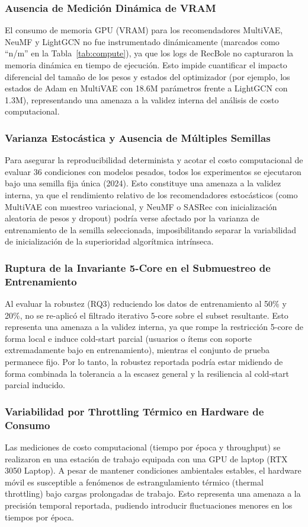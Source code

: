\documentclass[journal]{IEEEtran}
\begin{document}
\subsubsection{Ausencia de Medición Dinámica de VRAM}
El consumo de memoria GPU (VRAM) para los recomendadores MultiVAE, NeuMF y LightGCN no fue instrumentado dinámicamente (marcados como ``n/m'' en la Tabla~\ref{tab:compute}), ya que los logs de RecBole no capturaron la memoria dinámica en tiempo de ejecución. Esto impide cuantificar el impacto diferencial del tamaño de los pesos y estados del optimizador (por ejemplo, los estados de Adam en MultiVAE con 18.6M parámetros frente a LightGCN con 1.3M), representando una amenaza a la validez interna del análisis de costo computacional.

\subsubsection{Varianza Estocástica y Ausencia de Múltiples Semillas}
Para asegurar la reproducibilidad determinista y acotar el costo computacional de evaluar 36 condiciones con modelos pesados, todos los experimentos se ejecutaron bajo una semilla fija única (2024). Esto constituye una amenaza a la validez interna, ya que el rendimiento relativo de los recomendadores estocásticos (como MultiVAE con muestreo variacional, y NeuMF o SASRec con inicialización aleatoria de pesos y dropout) podría verse afectado por la varianza de entrenamiento de la semilla seleccionada, imposibilitando separar la variabilidad de inicialización de la superioridad algorítmica intrínseca.

\subsubsection{Ruptura de la Invariante 5-Core en el Submuestreo de Entrenamiento}
\label{subsec:ruptura-5core}
Al evaluar la robustez (RQ3) reduciendo los datos de entrenamiento al 50\% y 20\%, no se re-aplicó el filtrado iterativo 5-core sobre el subset resultante. Esto representa una amenaza a la validez interna, ya que rompe la restricción 5-core de forma local e induce cold-start parcial (usuarios o ítems con soporte extremadamente bajo en entrenamiento), mientras el conjunto de prueba permanece fijo. Por lo tanto, la robustez reportada podría estar midiendo de forma combinada la tolerancia a la escasez general y la resiliencia al cold-start parcial inducido.

\subsubsection{Variabilidad por Throttling Térmico en Hardware de Consumo}
Las mediciones de costo computacional (tiempo por época y throughput) se realizaron en una estación de trabajo equipada con una GPU de laptop (RTX 3050 Laptop). A pesar de mantener condiciones ambientales estables, el hardware móvil es susceptible a fenómenos de estrangulamiento térmico (thermal throttling) bajo cargas prolongadas de trabajo. Esto representa una amenaza a la precisión temporal reportada, pudiendo introducir fluctuaciones menores en los tiempos por época.
\end{document}
